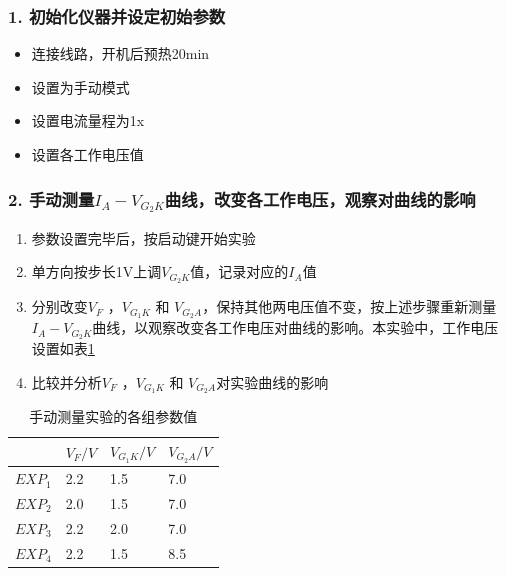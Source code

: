 \documentclass[12pt,a4paper,UTF8]{ctexart}
\begin{document}
	\subsubsection*{1. 初始化仪器并设定初始参数}
		\begin{itemize}
			\item 连接线路，开机后预热20min
			\item 设置为手动模式
			\item 设置电流量程为1x
			\item 设置各工作电压值
		\end{itemize}
	\subsubsection*{2. 手动测量$I_A-V_{G_2K}$曲线，改变各工作电压，观察对曲线的影响}
		\begin{enumerate}[label=\arabic*.]
			\item 参数设置完毕后，按启动键开始实验
			\item 单方向按步长1V上调$V_{G_2K}$值，记录对应的$I_A$值
			\item 分别改变$V_F$  ，$V_{G_1K}$ 和 $V_{G_2A}$，保持其他两电压值不变，按上述步骤重新测量$I_A-V_{G_2K}$曲线，以观察改变各工作电压对曲线的影响。本实验中，工作电压设置如表\ref{tab:manual}
			\item 比较并分析$V_F$  ，$V_{G_1K}$ 和 $V_{G_2A}$对实验曲线的影响	
		\end{enumerate}
		\begin{table}[htbp]
			\centering
			\begin{tabular}{|l|l|l|l|}
			\hline
				& $V_F/V$ & $V_{G_1K}/V$ & $V_{G_2A}/V$ \\ \hline
				$EXP_1$ & 2.2 & 1.5 & 7.0 \\ \hline
				$EXP_2$ & 2.0 & 1.5 & 7.0 \\ \hline
				$EXP_3$ & 2.2 & 2.0 & 7.0 \\ \hline
				$EXP_4$ & 2.2 & 1.5 & 8.5 \\ \hline
			\end{tabular}
			\caption{手动测量实验的各组参数值}
			\label{tab:manual}
		\end{table}
\end{document}
